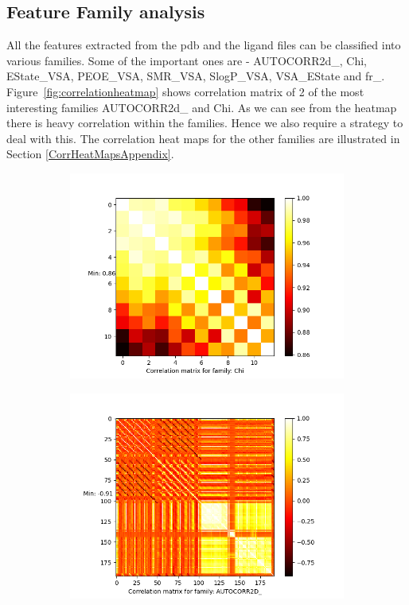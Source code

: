 \documentclass[11pt]{article}
\begin{document}
\subsection{Feature Family analysis}
\label{CorrelationAnalysis}
All the features extracted from the pdb and the ligand files can be classified into various families.
Some of the important ones are - AUTOCORR2d\_, Chi, EState\_VSA,  PEOE\_VSA,  SMR\_VSA,  SlogP\_VSA,  VSA\_EState and fr\_.
Figure~\ref{fig:correlationheatmap} shows correlation matrix of 2 of the most interesting families AUTOCORR2d\_ and Chi.
As we can see from the heatmap there is heavy correlation within the families.
Hence we also require a strategy to deal with this.
The correlation heat maps for the other families are illustrated in Section \ref{CorrHeatMapsAppendix}.

\begin{figure}[htb]
    \begin{subfigure}[b]{0.45\textwidth}
         \centering
         \includegraphics[scale=0.45]{images/correlationChi}
        \label{fig:correlationChi}
     \end{subfigure}
     \hfill
    \begin{subfigure}[b]{0.45\textwidth}
         \centering
         \includegraphics[scale=0.45]{images/correlationAUTOCORR2D}

\end{subfigure}
\end{figure}
\end{document}
